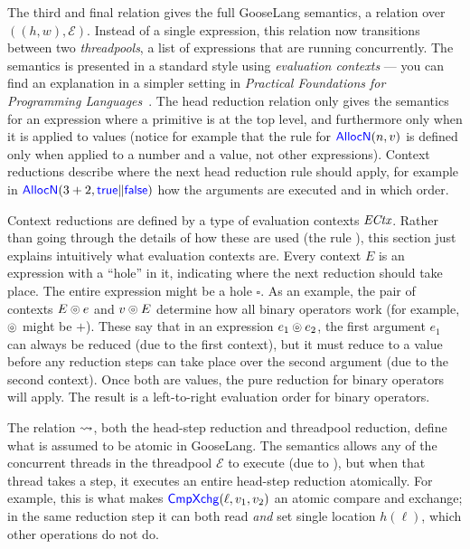 The third and final relation gives the full GooseLang semantics, a relation over
$((h, w), \mathcal{E})$. Instead of a
single expression, this relation now transitions between two \emph{threadpools},
a list of expressions that are
running concurrently. The semantics is presented in a standard style using
\emph{evaluation contexts} --- you can find an explanation in a simpler setting
in \emph{Practical Foundations for Programming Languages}~\cite[\S
5.3]{harper:pfpl}. The head reduction relation only gives the semantics for an
expression where a primitive is at the top level, and furthermore only when it is
applied to values (notice for example that the rule for $\mathsf{\textcolor{blue}{AllocN}}(n, v)$
is defined only when applied to a number and a value, not other expressions).
Context reductions describe where the next head reduction rule should apply, for
example in $\mathsf{\textcolor{blue}{AllocN}}(3+2, \mathsf{\textcolor{blue}{true}} \| \mathsf{\textcolor{blue}{false}})$ how the arguments
are executed and in which order.

Context reductions are defined by a type of evaluation contexts
$\textit{ECtx}$. Rather than going through the details of how these are used
(the rule ), this section just explains intuitively what
evaluation contexts are. Every context $E$ is an expression with a ``hole'' in
it, indicating where the next reduction should take place. The entire expression
might be a hole $\square$. As an example, the pair of contexts $E \circledcirc e$ and
$v \circledcirc E$ determine how all binary operators work (for example, $\circledcirc$
might be $+$). These say that in an expression $e_{1} \circledcirc e_{2}$, the first argument
$e_{1}$ can always be reduced (due to the first context), but it must reduce
to a value before any reduction steps can take place over the second argument (due to
the second context). Once both are values, the pure reduction for binary
operators will apply. The result is a left-to-right evaluation order for binary
operators.

The relation $\rightsquigarrow$, both the head-step reduction and threadpool reduction,
define what is assumed to be atomic in GooseLang. The semantics allows any of
the concurrent threads in the threadpool $\mathcal{E}$ to execute (due to
), but when that thread takes a step, it executes an
entire head-step reduction atomically. For example, this is what makes
$\mathsf{\textcolor{blue}{CmpXchg}}(\ell, v_1, v_2)$ an atomic compare and exchange; in the same
reduction step it can both read \emph{and} set single location $h(\ell)$, which
other operations do not do.

